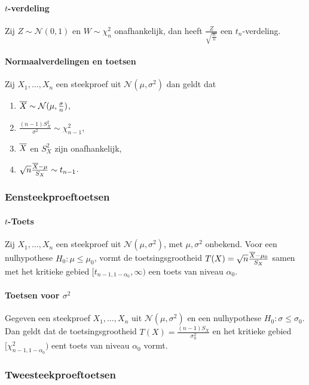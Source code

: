 \paragraph{\texorpdfstring{\(t\)}{t}-verdeling} Zij \(Z\sim\mathcal{N}(0,1)\) en
\(W\sim\chi^{2}_{n}\) onafhankelijk, dan heeft \(\frac{Z}{\sqrt{\frac{W}{n}}}\)
een \(t_{n}\)-verdeling.

\paragraph{Normaalverdelingen en toetsen} Zij \(X_{1},\dots,X_{n}\) een
steekproef uit \(\mathcal{N}(\mu,\sigma^{2})\) dan geldt dat
\begin{enumerate}
    \item \(\overline{X}\sim\mathcal{N}(\mu,\frac{\sigma}{n})\),
    \item \(\frac{(n-1)S_{X}^{2}}{\sigma^{2}}\sim\chi^{2}_{n-1}\),
    \item \(\overline{X}\) en \(S_{X}^{2}\) zijn onafhankelijk,
    \item \(\sqrt{n}\frac{\overline{X}-\mu}{S_{X}}\sim t_{n-1}\).
\end{enumerate}

\subsubsection{Eensteekproeftoetsen}
\paragraph{\texorpdfstring{\(t\)}{t}-Toets} Zij \(X_{1},\dots,X_{n}\) een
steekproef uit \(\mathcal{N}(\mu,\sigma^{2})\), met \(\mu,\sigma^{2}\) onbekend.
Voor een nulhypothese \(H_{0}:\mu\leq\mu_{0}\), vormt de toetsingsgrootheid
\(T(X)=\sqrt{n}\frac{\overline{X}-\mu_{0}}{S_{X}}\) samen met het kritieke gebied
\([t_{n-1,1-\alpha_{0}},\infty)\) een toets van niveau \(\alpha_{0}\).

\paragraph{Toetsen voor \texorpdfstring{\(\sigma^{2}\)}{s^2}} Gegeven een
steekproef \(X_{1},\dots,X_{n}\) uit \(\mathcal{N}(\mu,\sigma^{2})\) en een
nulhypothese \(H_{0}:\sigma\leq\sigma_{0}\). Dan geldt dat de toetsingsgrootheid
\(T(X)=\frac{(n-1)S_{X}}{\sigma_{0}^{2}}\) en het kritieke gebied
\([\chi^{2}_{n-1,1-\alpha_{0}})\) eent toets van niveau \(\alpha_{0}\) vormt.

\subsubsection{Tweesteekproeftoetsen}
